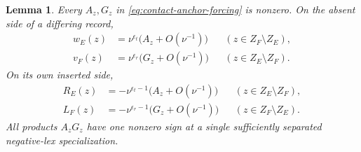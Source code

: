 \documentclass[11pt,a4paper]{amsart}
\numberwithin{equation}{section}
\theoremstyle{plain}
\newtheorem{lemma}[theorem]{Lemma}
\theoremstyle{definition}
\begin{document}
\begin{lemma}\label{lem:contact-leading}
Every \(A_z,G_z\) in \eqref{eq:contact-anchor-forcing} is nonzero.  On the
absent side of a differing record,
\begin{equation}
\begin{aligned}
 w_E(z)&=\nu^{\epsilon_t}\bigl(A_z+O(\nu^{-1})\bigr)
       &&(z\in Z_F\setminus Z_E),\\
 v_F(z)&=\nu^{\epsilon_r}\bigl(G_z+O(\nu^{-1})\bigr)
       &&(z\in Z_E\setminus Z_F).
\end{aligned}
 \label{eq:contact-absent-leading}
\end{equation}
On its own inserted side,
\begin{equation}
\begin{aligned}
 R_E(z)&=-\nu^{\epsilon_t-1}\bigl(A_z+O(\nu^{-1})\bigr)
       &&(z\in Z_E\setminus Z_F),\\
 L_F(z)&=-\nu^{\epsilon_r-1}\bigl(G_z+O(\nu^{-1})\bigr)
       &&(z\in Z_F\setminus Z_E).
\end{aligned}
 \label{eq:contact-own-leading}
\end{equation}
All products \(A_zG_z\) have one nonzero sign at a single sufficiently
separated negative-lex specialization.
\end{lemma}
\end{document}

